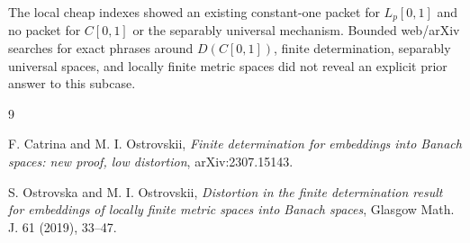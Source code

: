 \documentclass[11pt]{article}
\begin{document}
The local cheap indexes showed an existing constant-one packet for
$L_p[0,1]$ and no packet for $C[0,1]$ or the separably universal mechanism.
Bounded web/arXiv searches for exact phrases around $D(C[0,1])$, finite
determination, separably universal spaces, and locally finite metric spaces
did not reveal an explicit prior answer to this subcase.

\begin{thebibliography}{9}

F. Catrina and M. I. Ostrovskii,
\emph{Finite determination for embeddings into Banach spaces: new proof, low
distortion}, arXiv:2307.15143.

S. Ostrovska and M. I. Ostrovskii,
\emph{Distortion in the finite determination result for embeddings of locally
finite metric spaces into Banach spaces}, Glasgow Math. J. 61 (2019), 33--47.

\end{thebibliography}
\end{document}
